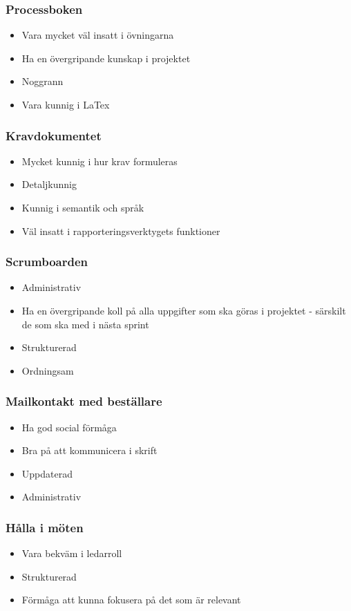 \documentclass[12pt]{article}
\begin{document}
\subsubsection{Processboken}
\begin{itemize}
\item Vara mycket väl insatt i övningarna
\item Ha en övergripande kunskap i projektet
\item Noggrann
\item Vara kunnig i LaTex
\end{itemize}

\subsubsection{Kravdokumentet}
\begin{itemize}
\item Mycket kunnig i hur krav formuleras
\item Detaljkunnig
\item Kunnig i semantik och språk
\item Väl insatt i rapporteringsverktygets funktioner
\end{itemize}

\subsubsection{Scrumboarden}
\begin{itemize}
\item Administrativ
\item Ha en övergripande koll på alla uppgifter som ska göras i projektet - särskilt de som ska med i nästa sprint
\item Strukturerad
\item Ordningsam
\end{itemize}

\subsubsection{Mailkontakt med beställare}
\begin{itemize}
\item Ha god social förmåga
\item Bra på att kommunicera i skrift
\item Uppdaterad
\item Administrativ
\end{itemize}

\subsubsection{Hålla i möten}
\begin{itemize}
\item Vara bekväm i ledarroll
\item Strukturerad
\item Förmåga att kunna fokusera på det som är relevant
\end{itemize}
\end{document}
